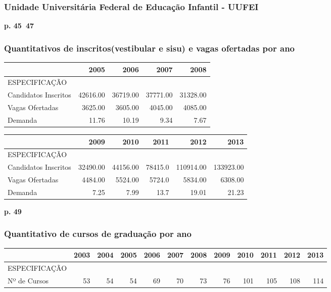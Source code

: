 \documentclass{article}
\begin{document}
\subsubsection*{Unidade Universitária Federal de Educação Infantil - UUFEI}
\textbf{p. 45~47}

\subsubsection*{Quantitativos de inscritos(vestibular e sisu) e vagas ofertadas por ano}
\begin{tabular}{lrrrr}
\toprule
{} &      2005 &      2006 &      2007 &      2008 \\
\midrule
ESPECIFICAÇÃO        &           &           &           &           \\
Candidatos Inscritos &  42616.00 &  36719.00 &  37771.00 &  31328.00 \\
Vagas Ofertadas      &  3625.00 &  3605.00 &  4045.00 &  4085.00 \\
Demanda              &  11.76 &  10.19 &  9.34 &  7.67 \\
\bottomrule
\end{tabular}

\begin{tabular}{lrrrrr}
\toprule
{} &      2009 &      2010 &     2011 &       2012 &       2013 \\
\midrule
ESPECIFICAÇÃO        &           &           &          &            &            \\
Candidatos Inscritos &  32490.00 &  44156.00 &  78415.0 &  110914.00 &  133923.00 \\
Vagas Ofertadas      &  4484.00 &  5524.00 &  5724.0 &  5834.00 &  6308.00 \\
Demanda              &  7.25 &  7.99 &  13.7 &  19.01 &  21.23 \\
\bottomrule
\end{tabular}

\textbf{p. 49}

\subsubsection*{Quantitativo de cursos de graduação por ano}
\begin{tabular}{lrrrrrrrrrrr}
\toprule
{} &  2003 &  2004 &  2005 &  2006 &  2007 &  2008 &  2009 &  2010 &  2011 &  2012 &  2013 \\
\midrule
ESPECIFICAÇÃO &       &       &       &       &       &       &       &       &       &       &       \\
Nº de Cursos  &  53 &  54 &  54 &  69 &  70 &  73 &  76 &  101 &  105 &  108 &  114 \\
\bottomrule
\end{tabular}
\end{document}
